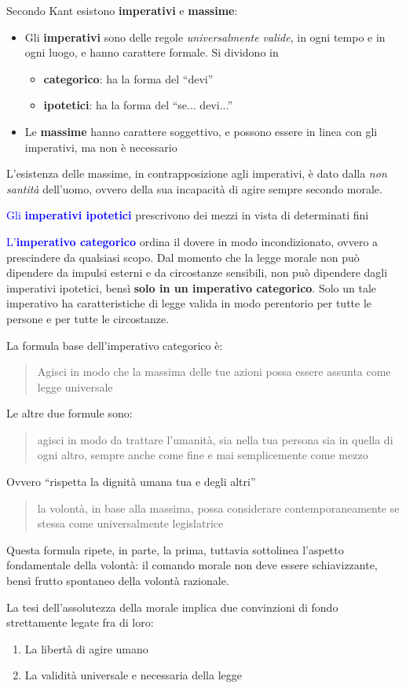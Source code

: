 \documentclass[a4paper, twoside, titlepage]{book}
\newcommand{\citazione}[1]{%
  \begin{quotation}
  #1
  \end{quotation}}
\renewcommand{\emph}[1]{\textcolor{blue}{#1}}
\begin{document}
Secondo Kant esistono \textbf{imperativi} e \textbf{massime}:
\begin{itemize}
\item Gli \textbf{imperativi} sono delle regole \textit{universalmente valide}, in ogni tempo e in ogni luogo, e hanno carattere formale. Si dividono in 
\begin{itemize}
  \item \textbf{categorico}: ha la forma del “devi”
  \item \textbf{ipotetici}: ha la forma del “se... devi...”
  \end{itemize}
\item Le \textbf{massime} hanno carattere soggettivo, e possono essere in linea con gli imperativi, ma non è necessario
\end{itemize}
L’esistenza delle massime, in contrapposizione agli imperativi, è dato dalla \textit{non santità} dell’uomo, ovvero della sua incapacità di agire sempre secondo morale.

\emph{Gli \textbf{imperativi ipotetici}} prescrivono dei mezzi in vista di determinati fini

\emph{L’\textbf{imperativo categorico}} ordina il dovere in modo incondizionato, ovvero a prescindere da qualsiasi scopo.
Dal momento che la legge morale non può dipendere da impulsi esterni e da circostanze sensibili, non può dipendere dagli imperativi ipotetici, bensì \textbf{solo in un imperativo categorico}.
Solo un tale imperativo ha caratteristiche di legge valida in modo perentorio per tutte le persone e per tutte le circostanze.

La formula base dell’imperativo categorico è:
\citazione{Agisci in modo che la massima delle tue azioni possa essere assunta come legge universale}

Le altre due formule sono:
\citazione{agisci in modo da trattare l’umanità, sia nella tua persona sia in quella di ogni altro, sempre anche come fine e mai semplicemente come mezzo}

Ovvero “rispetta la dignità umana tua e degli altri”
\citazione{la volontà, in base alla massima, possa considerare contemporaneamente se stessa come universalmente legislatrice}

Questa formula ripete, in parte, la prima, tuttavia sottolinea l’aspetto fondamentale della volontà: il comando morale non deve essere schiavizzante, bensì frutto spontaneo della volontà razionale.

La tesi dell’assolutezza della morale implica due convinzioni di fondo strettamente legate fra di loro:
\begin{enumerate}
\item La libertà di agire umano
\item La validità universale e necessaria della legge
\end{enumerate}
\end{document}
